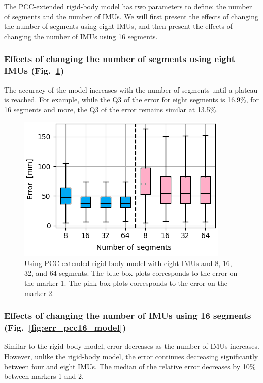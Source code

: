 The PCC-extended rigid-body model has two parameters to define: the number of segments and the number of IMUs. 
We will first present the effects of changing the number of segments using eight IMUs, and then present the effects of changing the number of IMUs using 16 segments.

\subsubsection{Effects of changing the number of segments using eight IMUs (Fig.~\ref{fig:plateau})}

The accuracy of the model increases with the number of segments until a plateau is reached. 
For example, while the Q3 of the error for eight segments is 16.9\%, for 16 segments and more, the Q3 of the error remains similar at 13.5\%.

\begin{figure}[ht!]
    \centering
    \includegraphics[width=\linewidth]{fig/plateau.png}
    \caption{Using PCC-extended rigid-body model with eight IMUs and 8, 16, 32, and 64 segments. The blue box-plots corresponds to the error on the marker 1. The pink box-plots corresponds to the error on the marker 2.}
    \label{fig:plateau}
\end{figure}

\subsubsection{Effects of changing the number of IMUs using 16 segments (Fig.~\ref{fig:err_pcc16_model})}

Similar to the rigid-body model, error decreases as the number of IMUs increases. However, unlike the rigid-body model, the error continues decreasing significantly between four and eight IMUs. The median of the relative error decreases by 10\% between markers 1 and 2. 

